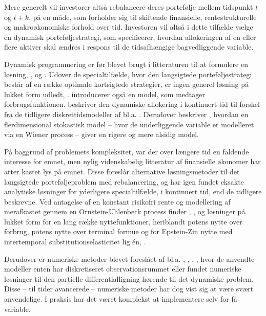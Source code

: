 \documentclass[
  a4paper,
  oneside]{memoir}
\begin{document}
Mere generelt vil investorer altså rebalancere deres portefølje mellem tidspunkt \(t\) og \(t+k\), på en måde, som forholder sig til skiftende finansielle, rentestrukturelle og makroøkonomiske forhold over tid. Investoren vil altså i dette tilfælde vælge en dynamisk porteføljestrategi, som specificerer, hvordan allokeringen af en eller flere aktiver skal ændres i respons til de tidsafhængige bagvedliggende variable.

Dynamisk programmering er før blevet brugt i litteraturen til at formulere en løsning, \citep{Mossin1968}, \citep{Samuelson1969} og \citep{Merton1969, Merton1971, Merton1973}. Udover de specialtilfælde, hvor den langsigtede porteføljestrategi består af en række optimale kortsigtede strategier, er ingen generel løsning på lukket form udledt, \citep{JurVic2011}. \citep{Samuelson1969} introducerer også en model, som medtager forbrugsfunktionen. \citep{Merton1969} beskriver den dynamiske allokering i kontinuert tid til forskel fra de tidligere diskrettidsmodeller af bl.a. \citep{Samuelson1969}. Derudover beskriver \citep{Merton1969}, hvordan en flerdimensional stokastisk model -- hvor de underliggende variable er modelleret via en Wiener process -- giver en rigere og mere alsidig model.

På baggrund af problemets kompleksitet, var der over længere tid en faldende interesse for emnet, men nylig videnskabelig litteratur af finansielle økonomer har atter kastet lys på emnet. Disse foreslår alternative løsningsmetoder til det langsigtede porteføljeproblem med rebalancering, og har igen fundet eksakte analytiske løsninger for yderligere specialtilfælde, i kontinuert tid, end de tidligere beskrevne. Ved antagelse af en konstant risikofri rente og modellering af merafkastet gennem en Ornstein-Uhlenbeck process finder \citep{BrenXia2002}, \citep{CampVic1999}, \citep{KimOm1996} og \citep{Wachter2002} løsninger på lukket form for en lang række nyttefunktioner, heriblandt potens nytte over forbrug, potens nytte over terminal formue og for Epstein-Zin nytte med intertemporal substitutionselasticitet lig én, \citep{CampVic2003}.

Derudover er numeriske metoder blevet foreslået af bl.a. \citep{BalLyn1999}, \citep{Lyn2001}, \citep{Bar2000}, \citep{BrenSchLag1997, BrenSchLag1999}, hvor de anvendte modeller enten har diskretiseret observationsrummet eller fundet numeriske løsninger til den partielle differentialligning hørende til det dynamiske problem. Disse -- til tider avancerede -- numeriske metoder har dog vist sig at være svært anvendelige. I praksis har det været komplekst at implementere selv for få variable.
\end{document}
